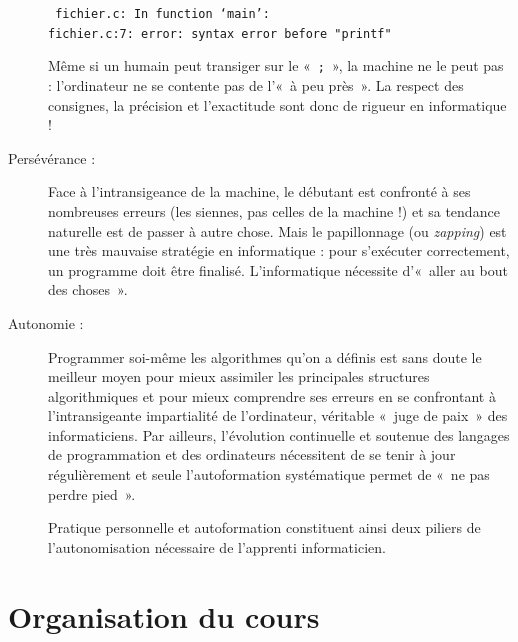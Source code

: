 \begin{description}
\begin{ex}
	\noindent\mbox{}\hspace*{1cm}\begin{minipage}[t]{12cm}\tt
	fichier.c: In function `main':\\
	fichier.c:7: error: syntax error before "printf"
	\end{minipage}
	\end{ex}
	Même si un humain peut transiger sur le «~{\tt ;}~», la machine ne le peut pas : 
	l'ordinateur ne se contente pas de l'«~à peu près~».
	La respect des consignes, la précision et l'exactitude sont donc de 
	rigueur en informatique !
	
\item[Persévérance :] \mbox{}
	Face à l'intransigeance de la machine, le débutant est confronté
	à ses nombreuses erreurs (les siennes, pas celles de la machine !) et sa tendance
	naturelle est de passer à autre chose. 
	Mais le papillonnage (ou {\em zapping})
	est une très mauvaise stratégie en informatique : pour s'exécuter correctement,
	un programme doit être finalisé. L'informatique nécessite d'«~aller au bout des
	choses~».
\item[Autonomie :] Programmer soi-même les algorithmes
	qu'on a définis est sans doute le meilleur moyen pour mieux assimiler
	les principales structures algorithmiques et pour mieux comprendre ses
	erreurs en se confrontant à l'intransigeante impartialité de l'ordinateur,
	vérita\-ble «~juge de paix~» des informaticiens.
	Par ailleurs, l'évolution continuelle et soutenue des langages de programmation et des 
	ordinateurs nécessitent de se tenir à jour régulièrement et seule l'autoformation systématique 
	permet de «~ne pas perdre pied~».
	
	Pratique personnelle et autoformation constituent ainsi deux piliers de
	l'autonomisation nécessaire de l'apprenti informaticien.
\end{description}


\section{Organisation du cours}

